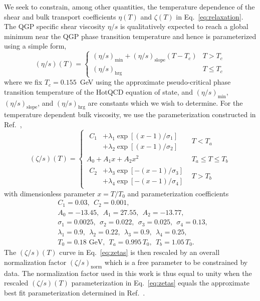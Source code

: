 \documentclass[aps,prc,reprint,amsmath,nofootinbib,superscriptaddress]{revtex4-1}
\begin{document}
We seek to constrain, among other quantities, the temperature dependence of the shear and bulk transport coefficients $\eta(T)$ and $\zeta(T)$ in Eq.~\eqref{eq:relaxation}.
The QGP specific shear viscosity $\eta/s$ is qualitatively expected to reach a global minimum near the QGP phase transition temperature and hence is parameterized using a simple form,
\begin{equation}
  (\eta/s)(T) =
  \begin{cases}
    (\eta/s)_\text{min} + (\eta/s)_\text{slope} (T - T_c) & T > T_c \\
    (\eta/s)_\text{hrg}                                   & T \le T_c
  \end{cases}
  \label{eq:etas}
\end{equation}
where we fix $T_c = 0.155$~GeV using the approximate pseudo-critical phase transition temperature of the HotQCD equation of state, and $(\eta/s)_\text{min}$, $(\eta/s)_\text{slope}$, and $(\eta/s)_\text{hrg}$ are constants which we wish to determine.
For the temperature dependent bulk viscosity, we use the parameterization constructed in Ref.~\cite{Denicol:2009am, Ryu:2015vwa},
\begin{equation}
  (\zeta/s)(T) =
  \begin{cases}
    \begin{aligned}
      C_1 &+ \lambda_1 \exp [(x-1)/\sigma_1]  \\ &+ \lambda_2 \exp [ (x-1)/\sigma_2]
    \end{aligned}
    &T < T_a \\[3ex]
    A_0 + A_1 x + A_2 x^2 &T_a \le T \le T_b \\[2ex]
    \begin{aligned}
      C_2 &+ \lambda_3 \exp [-(x-1)/\sigma_3]  \\ &+ \lambda_4 \exp [-(x-1)/\sigma_4]
    \end{aligned}
    &T > T_b
  \end{cases}
  \label{eq:zetas}
\end{equation}
with dimensionless parameter $x = T/T_0$ and parameterization coefficients
\begin{align*}
  &C_1=0.03, ~~C_2=0.001, \\
  &A_0=-13.45, ~~A_1=27.55, ~~A_2=-13.77, \\
  &\sigma_1=0.0025, ~~\sigma_2=0.022, ~~\sigma_3=0.025, ~~\sigma_4=0.13, \\
  &\lambda_1=0.9, ~~\lambda_2=0.22, ~~\lambda_3=0.9, ~~\lambda_4=0.25, \\
  &T_0 = 0.18 \text{ GeV}, ~~T_a = 0.995\, T_0, ~~T_b = 1.05\, T_0.
\end{align*}
The $(\zeta/s)(T)$ curve in Eq.~\eqref{eq:zetas} is then rescaled by an overall normalization factor $(\zeta/s)_\text{norm}$ which is a free parameter to be constrained by data.
The normalization factor used in this work is thus equal to unity when the rescaled $(\zeta/s)(T)$ parameterization in Eq.~\eqref{eq:zetas} equals the approximate best fit parameterization determined in Ref.~\cite{Ryu:2015vwa}.
\end{document}
